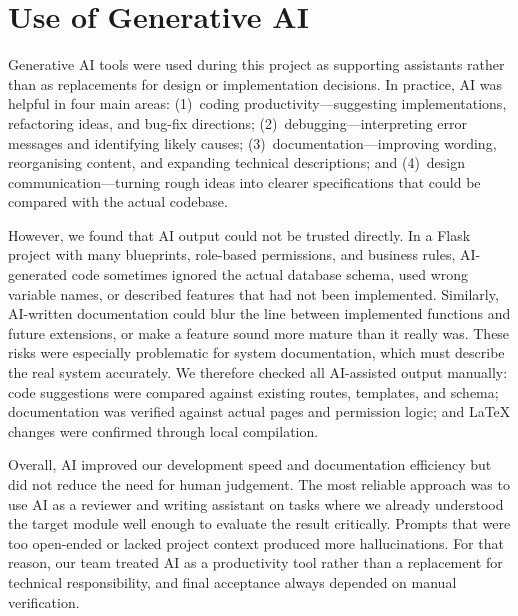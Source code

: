\documentclass[11pt,a4paper]{article}
\begin{document}
\section{Use of Generative AI}
Generative AI tools were used during this project as supporting assistants rather than as replacements for design or implementation decisions. In practice, AI was helpful in four main areas: (1)~coding productivity---suggesting implementations, refactoring ideas, and bug-fix directions; (2)~debugging---interpreting error messages and identifying likely causes; (3)~documentation---improving wording, reorganising content, and expanding technical descriptions; and (4)~design communication---turning rough ideas into clearer specifications that could be compared with the actual codebase.

However, we found that AI output could not be trusted directly. In a Flask project with many blueprints, role-based permissions, and business rules, AI-generated code sometimes ignored the actual database schema, used wrong variable names, or described features that had not been implemented. Similarly, AI-written documentation could blur the line between implemented functions and future extensions, or make a feature sound more mature than it really was. These risks were especially problematic for system documentation, which must describe the real system accurately. We therefore checked all AI-assisted output manually: code suggestions were compared against existing routes, templates, and schema; documentation was verified against actual pages and permission logic; and LaTeX changes were confirmed through local compilation.

Overall, AI improved our development speed and documentation efficiency but did not reduce the need for human judgement. The most reliable approach was to use AI as a reviewer and writing assistant on tasks where we already understood the target module well enough to evaluate the result critically. Prompts that were too open-ended or lacked project context produced more hallucinations. For that reason, our team treated AI as a productivity tool rather than a replacement for technical responsibility, and final acceptance always depended on manual verification.
\end{document}
